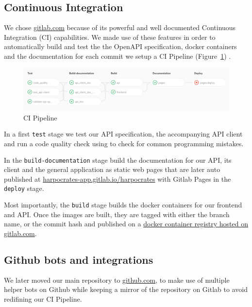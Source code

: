\documentclass[\version]{l4proj}
\begin{document}
\subsection{Continuous Integration}

We chose \href{https://gitlab.com/}{gitlab.com} because of its powerful and well documented Continuous Integration (CI) capabilities.
We made use of these features in order to automatically build and test the the OpenAPI specification, docker containers and the documentation for each commit we setup a CI Pipeline (Figure~\ref{fig:ci}) .

\begin{figure}[H]
    \centering
    \includegraphics[width=0.9\linewidth]{figures/ci.png}
    \caption{CI Pipeline}\label{fig:ci}
\end{figure}

In a first \verb|test| stage we test our API specification, the accompanying API client and run a code quality check using \textcite{Codeclimate2020} to check for common programming mistakes.

In the \verb|build-documentation| stage build the documentation for our API, its client and the general application as static web pages that are later auto published at \href{https://harpocrates-app.gitlab.io/harpocrates/}{harpocrates-app.gitlab.io/harpocrates} with Gitlab Pages in the \verb|deploy| stage.

Most importantly, the \verb|build| stage builds the docker containers for our frontend and API.
Once the images are built, they are tagged with either the branch name, or the commit hash and published on a \href{https://gitlab.com/harpocrates-app/harpocrates/container_registry}{docker container registry hosted on gitlab.com}.

\subsection{Github bots and integrations}

We later moved our main repository to \href{https://github.com/guillaumedsde/Harpocrates}{github.com}, to make use of multiple helper bots on Github while keeping a mirror of the repository on Gitlab to avoid redifining our CI Pipeline.
\end{document}
